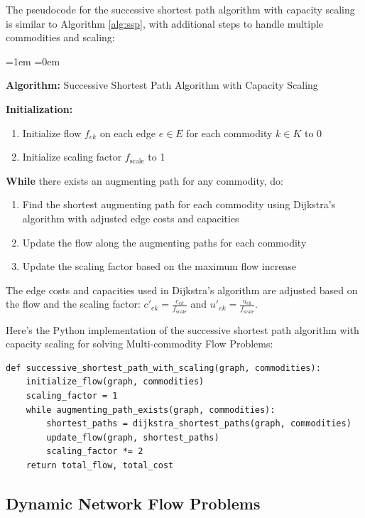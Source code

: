 \documentclass[12pt]{book} %
\begin{document}
The pseudocode for the successive shortest path algorithm with capacity scaling is similar to Algorithm \ref{alg:ssp}, with additional steps to handle multiple commodities and scaling:
\FloatBarrier
\begin{list}{}{\leftmargin=1em \itemindent=0em}
\item \textbf{Algorithm:} Successive Shortest Path Algorithm with Capacity Scaling
\item \textbf{Initialization:} 
\begin{enumerate}
\item Initialize flow $f_{ek}$ on each edge $e \in E$ for each commodity $k \in K$ to 0
\item Initialize scaling factor $f_{\text{scale}}$ to 1
\end{enumerate}
\item \textbf{While} there exists an augmenting path for any commodity, do:
\begin{enumerate}
\item Find the shortest augmenting path for each commodity using Dijkstra's algorithm with adjusted edge costs and capacities
\item Update the flow along the augmenting paths for each commodity
\item Update the scaling factor based on the maximum flow increase
\end{enumerate}
\end{list}
\FloatBarrier
The edge costs and capacities used in Dijkstra's algorithm are adjusted based on the flow and the scaling factor: \(c'_{ek} = \frac{c_{ek}}{f_{\text{scale}}}\) and \(u'_{ek} = \frac{u_{ek}}{f_{\text{scale}}}\).

Here's the Python implementation of the successive shortest path algorithm with capacity scaling for solving Multi-commodity Flow Problems:

\begin{lstlisting}
def successive_shortest_path_with_scaling(graph, commodities):
    initialize_flow(graph, commodities)
    scaling_factor = 1
    while augmenting_path_exists(graph, commodities):
        shortest_paths = dijkstra_shortest_paths(graph, commodities)
        update_flow(graph, shortest_paths)
        scaling_factor *= 2
    return total_flow, total_cost
\end{lstlisting}
\FloatBarrier

\subsection{Dynamic Network Flow Problems}
\end{document}
